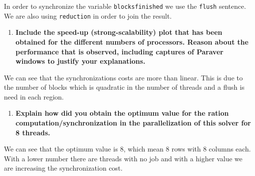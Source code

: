 \documentclass[a4paper]{article}
\newenvironment{questionenum}{%
\setlist[enumerate]{resume}
\restartlist{enumerate}
\newcommand{\question}[1]{
\begin{enumerate}
	\item\bfseries ##1
\end{enumerate}
}}{%
}
\begin{document}
\begin{questionenum}
	In order to synchronize the variable \texttt{blocksfinished}  we use the \texttt{flush} sentence. We are also using \texttt{reduction} in order to join the result.
	
	\question{Include the speed-up (strong-scalability) plot that has been obtained for the different numbers of processors. Reason about the performance that is observed, including captures of Paraver windows to justify your explanations.}
	
	\begin{figure}[H]
		\begin{subfigure}{0.49\textwidth}
			\centering
		\end{subfigure}
		\hfill
		\begin{subfigure}{0.49\textwidth}
			\centering
		\end{subfigure}
	\end{figure}

	We can see that the synchronizations costs are more than linear. This is due to the number of blocks which is quadratic in the number of threads and a flush is need in each region.
	
	\question{Explain how did you obtain the optimum value for the ration computation/synchronization in the parallelization of this solver for 8 threads.}
\end{questionenum}


	\begin{figure}[H]
		\centering
	\end{figure}

We can see that the optimum value is 8, which mean 8 rows with 8 columns each. With a lower number there are threads with no job and with a higher value we are increasing the synchronization cost.
\end{document}
